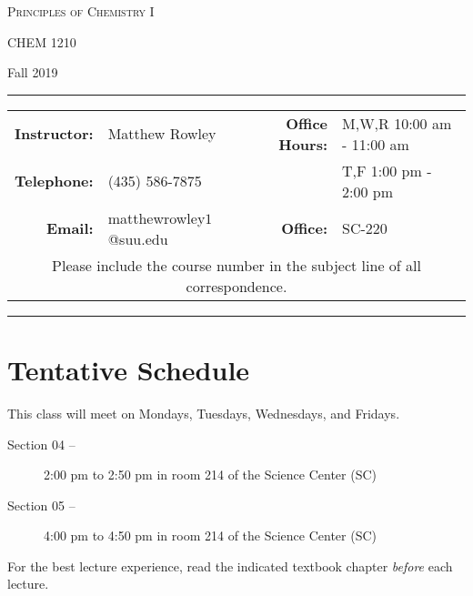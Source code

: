 \documentclass[12pt, letterpaper]{article}
\begin{document}
\begin{center}
	{\Large \textsc{Principles of Chemistry I}}
	
	CHEM 1210
\end{center}
\begin{center}
	{\large Fall 2019}
\end{center}
\begin{center}
	\rule{0.97\textwidth}{0.4pt}
	\begin{tabular}{rlcrl}
		\textbf{Instructor:} & Matthew Rowley & & \textbf{Office Hours:} & M,W,R 10:00 am - 11:00 am \\
		\textbf{Telephone:} & (435) 586-7875 & & & T,F 1:00 pm - 2:00 pm\\
		\textbf{Email:} & \multicolumn{2}{l}{matthewrowley$1$@suu.edu} & \textbf{Office:} & SC-220\\
		\multicolumn{5}{c}{Please include the course number in the subject line of all correspondence.} 
	\end{tabular}
	\rule{0.97\textwidth}{0.4pt}
\end{center}


\section*{Tentative Schedule}
This class will meet on Mondays, Tuesdays, Wednesdays, and Fridays.
\begin{description}
	\item[Section 04 --] 2:00 pm to 2:50 pm in room 214 of the Science Center (SC)
	\item[Section 05 --] 4:00 pm to 4:50 pm in room 214 of the Science Center (SC)
\end{description}

\noindent For the best lecture experience, read the indicated textbook chapter \emph{before} each lecture.

~
\end{document}
